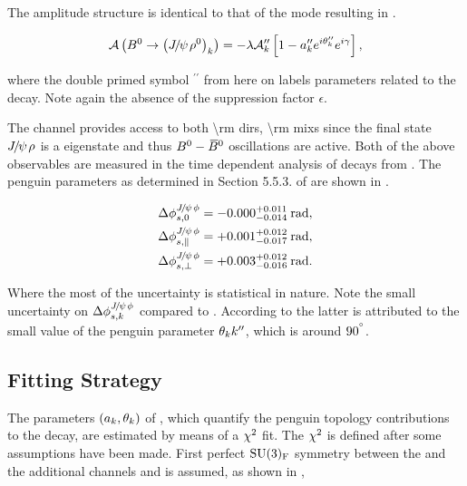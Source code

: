 \noindent The amplitude structure is identical to that of the \BsJpsiKst mode resulting in .

\begin{equation}
  \mathcal{A} \left( B^0\rightarrow \left({J\mskip -3mu/\mskip -2mu\psi\mskip 2mu} \rho^0\right)_{k} \right) = -\lambda \mathcal{A}_{k}'' \left[  1 - a_k'' e^{i\theta_k''} e^{i\gamma}  \right],
  \label{bsjpsirho_amp}
\end{equation}

\noindent where the double primed symbol ${}^{\prime\prime}$ from here on labels parameters related to the \BdJpsiRho decay.
Note again the absence of the suppression factor $\epsilon$.

The \BdJpsiRho channel provides access to both \Acp{\rm dir}, \Acp{\rm mix} since the final state ${J\mskip -3mu/\mskip -2mu\psi\mskip 2mu}\rho$ is
a \CP eigenstate and thus $B^0-\kern 0.18em\overline{\kern -0.18em B}{}^0$ oscillations are active. Both of the above observables are measured in the
time dependent analysis of \BdJpsipipi decays from \lhcb \cite{Aaij:2014vda}. The penguin parameters as determined
in Section 5.5.3. of \cite{DeBruyn-thesis} are shown in .

\begin{subequations}
  \label{delta_phis_jpsirho}
  \begin{align}
    \Delta\phi^{{J\mskip -3mu/\mskip -2mu\psi\mskip 2mu}\phi}_{s,{0}}         & = -0.000^{+0.011}_{-0.014}\:\text{rad},\\
    \Delta\phi^{{J\mskip -3mu/\mskip -2mu\psi\mskip 2mu}\phi}_{s,{\parallel}} & = +0.001^{+0.012}_{-0.017}\:\text{rad},\\
    \Delta\phi^{{J\mskip -3mu/\mskip -2mu\psi\mskip 2mu}\phi}_{s,{\perp}}     & = +0.003^{+0.012}_{-0.016}\:\text{rad}.
  \end{align}
\end{subequations}

\noindent Where the most of the uncertainty is statistical in nature. Note the small uncertainty on
$\Delta\phi^{{J\mskip -3mu/\mskip -2mu\psi\mskip 2mu}\phi}_{s,{k}}$ compared to . According to \cite{DeBruyn-thesis}
the latter is attributed to the small value of the penguin parameter $\theta_k{k}''$, which is around $90^{^{\circ}}$.

\subsection{Fitting Strategy}
\label{penguin_chi2_fit}

The parameters $(a_k,\theta_k)$ of , which quantify the penguin topology contributions
to the \BsJpsiPhi decay, are estimated by means of a $\chi^2$ fit. The $\chi^2$ is defined after some assumptions have
been made. First perfect $\mathrm{SU}(3)_{\rm F}$ symmetry between the \BsJpsiPhi and the additional channels \BsJpsiKst
and \BdJpsiRho is assumed, as shown in ,

